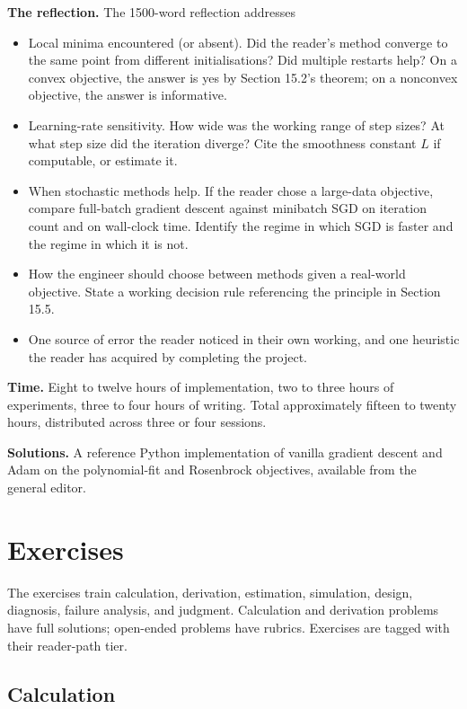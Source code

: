 \begin{project}
\textbf{The reflection.} The 1500-word reflection addresses
\begin{itemize}[leftmargin=*]
  \item Local minima encountered (or absent). Did the reader's
    method converge to the same point from different
    initialisations? Did multiple restarts help? On a convex
    objective, the answer is yes by Section 15.2's theorem; on
    a nonconvex objective, the answer is informative.
  \item Learning-rate sensitivity. How wide was the working
    range of step sizes? At what step size did the iteration
    diverge? Cite the smoothness constant $L$ if computable, or
    estimate it.
  \item When stochastic methods help. If the reader chose a
    large-data objective, compare full-batch gradient descent
    against minibatch SGD on iteration count and on wall-clock
    time. Identify the regime in which SGD is faster and the
    regime in which it is not.
  \item How the engineer should choose between methods given a
    real-world objective. State a working decision rule
    referencing the principle in Section 15.5.
  \item One source of error the reader noticed in their own
    working, and one heuristic the reader has acquired by
    completing the project.
\end{itemize}

\textbf{Time.} Eight to twelve hours of implementation, two to
three hours of experiments, three to four hours of writing.
Total approximately fifteen to twenty hours, distributed across
three or four sessions.

\textbf{Solutions.} A reference Python implementation of vanilla
gradient descent and Adam on the polynomial-fit and Rosenbrock
objectives, available from the general editor.

\end{project}

\section{Exercises}

The exercises train calculation, derivation, estimation,
simulation, design, diagnosis, failure analysis, and judgment.
Calculation and derivation problems have full solutions;
open-ended problems have rubrics. Exercises are tagged with their
reader-path tier.

\subsection*{Calculation}

